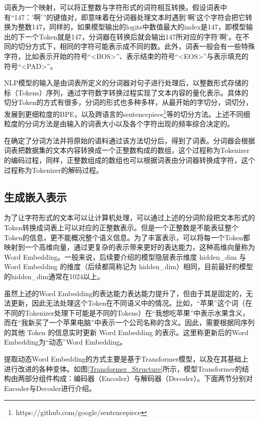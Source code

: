 词表为一个映射，可以将正整数与字符形式的词符相互转换。假设词表中有“147：'啊'”的键值对，即意味着在分词器处理文本时遇到'啊'这个字符会把它转换为整数147，同样的，如果模型输出的logits中数值最大的index是147，即模型输出的下一个Token就是147，分词器在转换后就会输出147所对应的字符'啊'。在不同的切分方式下，相同的字符可能表示成不同的数。此外，词表一般会有一些特殊字符，比如表示开始的符号“<BOS>”、表示结束的符号“<EOS>”与表示填充的符号“<PAD>”。

NLP模型的输入是由词表所定义的分词器对句子进行处理后，以整数形式存储的标（Tokens）序列，通过字符数字转换过程实现了文本内容的量化表示。具体的切分Token的方式有很多，分词的形式也多种多样，从最开始的字切分，词切分，发展到更细粒度的BPE\cite{NMTBPE}，以及跨语言的sentencepiece\footnote{https://github.com/google/sentencepiece}等的切分方法。上述不同细粒度的分词方法是由输入的词表大小以及各个字符出现的频率综合决定的。

在确定了分词方法并将原始的语料通过该方法切分后，得到了词表。分词器会根据词表把数据集的文本内容转换成一个正整数构成的数组，这个过程称为Tokenizer的编码过程，同样，正整数组成的数组也可以根据词表由分词器转换成字符，这个过程称为Tokenizer的解码过程。

\subsection{生成嵌入表示}

为了让字符形式的文本可以让计算机处理，可以通过上述的分词阶段把文本形式的Token转换成词表上可以对应的正整数表示。但是一个正整数是不能表征整个Token的信息，更不能概况整个语义信息。为了丰富表示，可以将每一个Token都映射到一个高维向量，通过更复杂的表示带来更好的表达能力，这种高维向量称为Word Embedding。一般来说，后续要介绍的模型隐层表示维度 hidden\_dim 与Word Embedding 的维度（后续都简称记为 hidden\_dim）相同，目前最好的模型的hidden\_dim通常在1024以上。

虽然上述的Word Embedding的表达能力表达能力提升了，但由于其是固定的，无法更新，因此无法处理这个Token在不同语义中的情况。比如，“苹果”这个词（在不同的Tokenizer处理下可能是不同的Tokens）在“我想吃苹果”中表示水果含义，而在“我新买了一个苹果电脑”中表示一个公司名称的含义。因此，需要根据同序列的其他 Token 的信息实时更新 Word Embedding 的表示。这里称更新后的Word Embedding为“动态”Word Embedding。

提取动态Word Embedding的方式主要是基于Transformer\cite{Attn_is_all_you_need}模型，以及在其基础上进行改进的各种变体\cite{BERT, GPT2, GPT3}。如图\ref{Transformer_Structure}所示，模型Transformer\cite{Attn_is_all_you_need}的结构由两部分组件构成：编码器（Encoder）与解码器（Decoder）。下面两节分别对Encoder与Decoder进行介绍。

